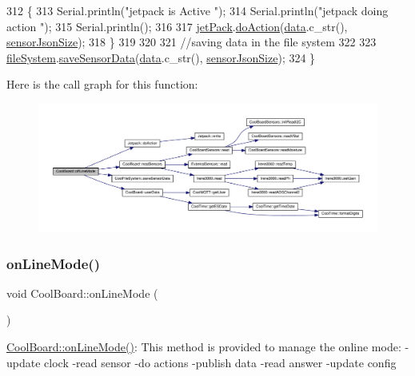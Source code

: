 \begin{DoxyCode}
312     \{
313         Serial.println(\textcolor{stringliteral}{"jetpack is Active "});
314         Serial.println(\textcolor{stringliteral}{"jetpack doing action "});
315         Serial.println();
316 
317         \hyperlink{classCoolBoard_a30b1357881b01ccbec676856a91e48e9}{jetPack}.\hyperlink{classJetpack_a86d2e83436ef4b85f4c3a6e85ac785b0}{doAction}(\hyperlink{classCoolBoard_a427fb753dd8575bdf821c70a5c63d695}{data}.c\_str(), \hyperlink{classCoolBoard_a58e4b6072e3ac8b141ec0befb479208e}{sensorJsonSize});
318     \}
319     
320     
321     \textcolor{comment}{//saving data in the file system}
322     
323     \hyperlink{classCoolBoard_a42c2586fbb13ff7f06538e9284e8538d}{fileSystem}.\hyperlink{classCoolFileSystem_a4c560c2ddd40b74b7758e6ceb2c58957}{saveSensorData}(\hyperlink{classCoolBoard_a427fb753dd8575bdf821c70a5c63d695}{data}.c\_str(), 
      \hyperlink{classCoolBoard_a58e4b6072e3ac8b141ec0befb479208e}{sensorJsonSize});
324 \}
\end{DoxyCode}
Here is the call graph for this function\+:
\nopagebreak
\begin{figure}[H]
\begin{center}
\leavevmode
\includegraphics[width=350pt]{classCoolBoard_ae6b5e1274d760462290192acea4adca8_cgraph}
\end{center}
\end{figure}
\mbox{\label{classCoolBoard_aa0bbc4bc605e35618d18e68795c61363}} 
\subsubsection{\texorpdfstring{on\+Line\+Mode()}{onLineMode()}}
{\footnotesize\ttfamily void Cool\+Board\+::on\+Line\+Mode (\begin{DoxyParamCaption}{ }\end{DoxyParamCaption})}

\hyperlink{classCoolBoard_aa0bbc4bc605e35618d18e68795c61363}{Cool\+Board\+::on\+Line\+Mode()}\+: This method is provided to manage the online mode\+: -\/update clock -\/read sensor -\/do actions -\/publish data -\/read answer -\/update config 

